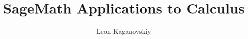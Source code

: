 \documentclass{xourse}
\begin{document}
\author{Leon Kaganovskiy}
\title{SageMath Applications to Calculus}
\maketitle


%
%
%
%
%
%
%
%
%
%
%
%

%
\end{document}
